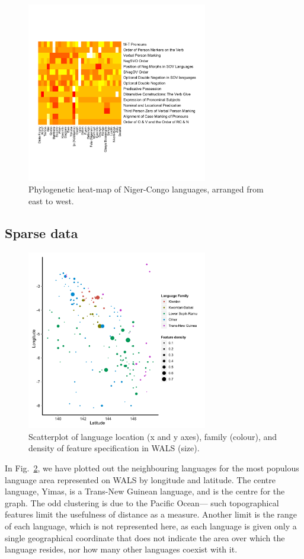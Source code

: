 \documentclass[11pt]{article}
\begin{document}
\begin{figure}[ht!]
\includegraphics[width=3.1in]
{graph3nigercongosmall.pdf} 
\caption{Phylogenetic heat-map of Niger-Congo languages, arranged from east to west.} 
\label{fig:heat2} 
\end{figure}


\subsection{Sparse data}

\begin{figure}[h]
\includegraphics[width=3.1in]
{graph1sparsenew.pdf} 
\caption{Scatterplot of language location (x and y axes), family (colour), and density of feature specification in WALS (size).} 
\label{fig:sparse} 
\end{figure}

In Fig.~\ref{fig:sparse}, we have plotted out the neighbouring languages for the most populous language area represented on WALS by longitude and latitude. The centre language, Yimas, is a Trans-New Guinean language, and is the centre for the graph. The odd clustering is due to the Pacific Ocean--- such topographical features limit the usefulness of distance as a measure.  Another limit is the range of each language, which is not represented here, as each language is given only a single geographical coordinate that does not indicate the area over which the language resides, nor how many other languages coexist with it.
\end{document}
